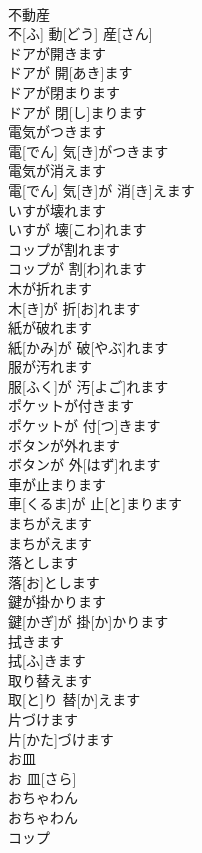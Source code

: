 \documentclass[8pt]{extreport}
\begin{document}
\begin{CJK}{UTF8}{min}
\\	不動産	
\\	不[ふ] 動[どう] 産[さん]		
\\	ドアが開きます	
\\	ドアが 開[あき]ます		
\\	ドアが閉まります	
\\	ドアが 閉[し]まります		
\\	電気がつきます	
\\	電[でん] 気[き]がつきます		
\\	電気が消えます	
\\	電[でん] 気[き]が 消[き]えます		
\\	いすが壊れます	
\\	いすが 壊[こわ]れます		
\\	コップが割れます	
\\	コップが 割[わ]れます		
\\	木が折れます	
\\	木[き]が 折[お]れます		
\\	紙が破れます	
\\	紙[かみ]が 破[やぶ]れます		
\\	服が汚れます	
\\	服[ふく]が 汚[よご]れます		
\\	ポケットが付きます	
\\	ポケットが 付[つ]きます		
\\	ボタンが外れます	
\\	ボタンが 外[はず]れます		
\\	車が止まります	
\\	車[くるま]が 止[と]まります		
\\	まちがえます	
\\	まちがえます		
\\	落とします	
\\	落[お]とします		
\\	鍵が掛かります	
\\	鍵[かぎ]が 掛[か]かります		
\\	拭きます	
\\	拭[ふ]きます		
\\	取り替えます	
\\	取[と]り 替[か]えます		
\\	片づけます	
\\	片[かた]づけます		
\\	お皿	
\\	お 皿[さら]		
\\	おちゃわん	
\\	おちゃわん		
\\	コップ	

\end{CJK}
\end{document}
